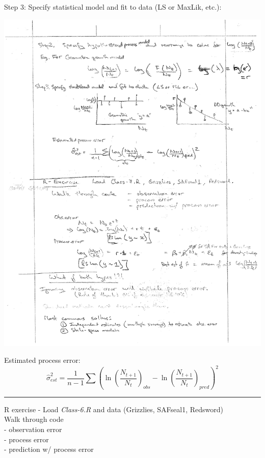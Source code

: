 \documentclass{article}
\newcommand{\note}[1]{\colorbox{gray!30}{#1}}
\newcommand{\ind}{\-\hspace{1cm}}
\begin{document}
Step 3: Specify statistical model and fit to data (LS or MaxLik, etc.):
\begin{center}
	\includegraphics[width=15cm]{figs/image3.pdf}
\end{center}

Estimated process error:
\begin{equation*}
	\hat{\sigma}_{est}^2 = \frac{1}{n-1}\sum \left(\ln\left(\frac{N_{t+1}}{N_t}\right)_{obs} - \ln\left(\frac{N_{t+1}}{N_t}\right)_{pred}\right)^2
\end{equation*}

\rule[0.5ex]{\linewidth}{1pt}

\pagebreak
\note{R exercise} - Load \emph{Class-6.R} and data (Grizzlies, SAFseal1, Redsword)\\
\ind \note{Walk through code}\\
\ind \ind - observation error\\
\ind \ind - process error\\
\ind \ind - prediction w/ process error\\
\end{document}
